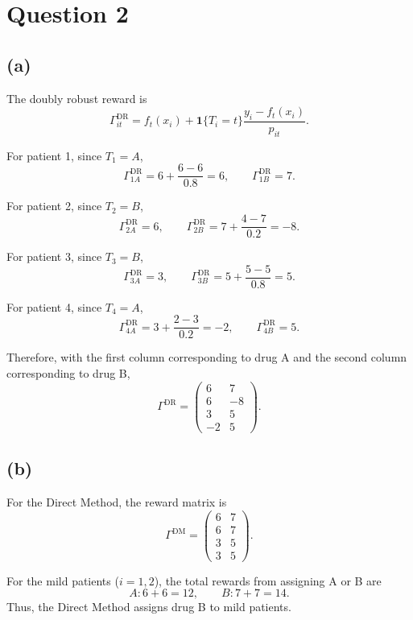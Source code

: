 \documentclass{article}
\begin{document}
\newpage


\section*{Question 2}

\subsection*{(a)}

The doubly robust reward is
\[
\Gamma_{it}^{\mathrm{DR}}
=
f_t(x_i)
+
\mathbf{1}\{T_i=t\}
\frac{y_i-f_t(x_i)}{p_{it}}.
\]

For patient 1, since $T_1=A$,
\[
\Gamma_{1A}^{\mathrm{DR}}
=
6+\frac{6-6}{0.8}
=
6,
\qquad
\Gamma_{1B}^{\mathrm{DR}}
=
7.
\]

For patient 2, since $T_2=B$,
\[
\Gamma_{2A}^{\mathrm{DR}}
=
6,
\qquad
\Gamma_{2B}^{\mathrm{DR}}
=
7+\frac{4-7}{0.2}
=
-8.
\]

For patient 3, since $T_3=B$,
\[
\Gamma_{3A}^{\mathrm{DR}}
=
3,
\qquad
\Gamma_{3B}^{\mathrm{DR}}
=
5+\frac{5-5}{0.8}
=
5.
\]

For patient 4, since $T_4=A$,
\[
\Gamma_{4A}^{\mathrm{DR}}
=
3+\frac{2-3}{0.2}
=
-2,
\qquad
\Gamma_{4B}^{\mathrm{DR}}
=
5.
\]

Therefore, with the first column corresponding to drug A and the second column corresponding to drug B,
\[
\Gamma^{\mathrm{DR}}
=
\begin{pmatrix}
6 & 7\\
6 & -8\\
3 & 5\\
-2 & 5
\end{pmatrix}.
\]

\vspace{5mm}
\subsection*{(b)}

For the Direct Method, the reward matrix is
\[
\Gamma^{\mathrm{DM}}
=
\begin{pmatrix}
6 & 7\\
6 & 7\\
3 & 5\\
3 & 5
\end{pmatrix}.
\]

For the mild patients ($i=1,2$), the total rewards from assigning A or B are
\[
A: 6+6=12,
\qquad
B: 7+7=14.
\]
Thus, the Direct Method assigns drug B to mild patients.
\end{document}
